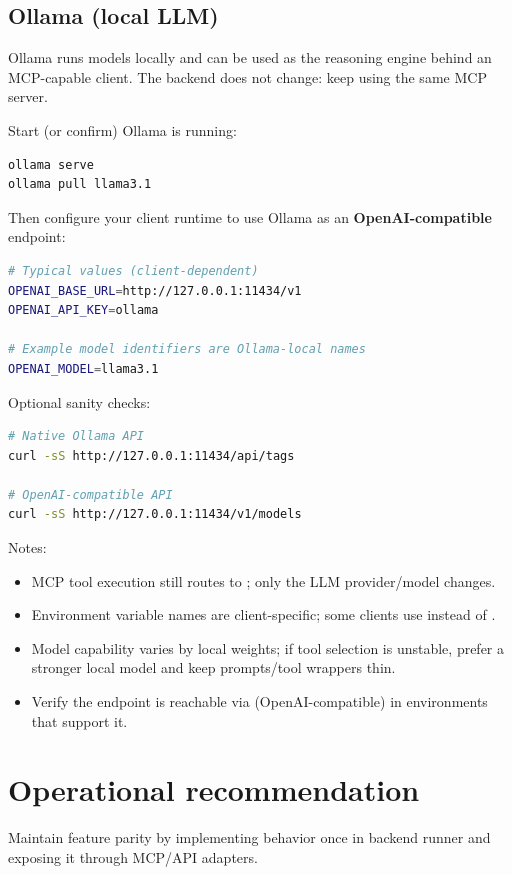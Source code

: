\subsection{Ollama (local LLM)}
Ollama runs models locally and can be used as the reasoning engine behind an MCP-capable client.
The \yolozu{} backend does not change: keep using the same \yolozu{} MCP server.

Start (or confirm) Ollama is running:
\begin{lstlisting}[language=bash]
ollama serve
ollama pull llama3.1
\end{lstlisting}

Then configure your client runtime to use Ollama as an \textbf{OpenAI-compatible} endpoint:
\begin{lstlisting}[language=bash]
# Typical values (client-dependent)
OPENAI_BASE_URL=http://127.0.0.1:11434/v1
OPENAI_API_KEY=ollama

# Example model identifiers are Ollama-local names
OPENAI_MODEL=llama3.1
\end{lstlisting}

Optional sanity checks:
\begin{lstlisting}[language=bash]
# Native Ollama API
curl -sS http://127.0.0.1:11434/api/tags

# OpenAI-compatible API
curl -sS http://127.0.0.1:11434/v1/models
\end{lstlisting}

Notes:
\begin{itemize}
  \item MCP tool execution still routes to ; only the LLM provider/model changes.
  \item Environment variable names are client-specific; some clients use  instead of .
  \item Model capability varies by local weights; if tool selection is unstable, prefer a stronger local model and keep prompts/tool wrappers thin.
  \item Verify the endpoint is reachable via  (OpenAI-compatible) in environments that support it.
\end{itemize}

\section{Operational recommendation}

Maintain feature parity by implementing behavior once in backend runner and exposing it through MCP/API adapters.

